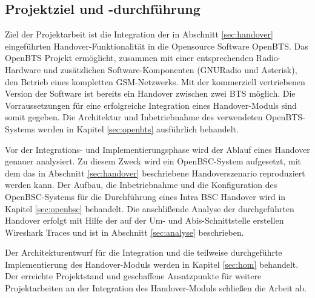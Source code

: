 \subsection{Projektziel und -durchführung}

Ziel der Projektarbeit ist die Integration der in Abschnitt \ref{sec:handover} eingeführten Handover-Funktionalität in die Opensource Software OpenBTS. Das OpenBTS Projekt ermöglicht, zusammen mit einer entsprechenden Radio-Hardware und zusätzlichen Software-Komponenten (GNURadio und Asterisk), den Betrieb eines kompletten GSM-Netzwerks. Mit der kommerziell vertriebenen Version der Software ist bereits ein Handover zwischen zwei BTS möglich. Die Vorraussetzungen für eine erfolgreiche Integration eines Handover-Moduls sind somit gegeben. Die Architektur und Inbetriebnahme des verwendeten OpenBTS-Systems werden in Kapitel \ref{sec:openbts} ausführlich behandelt.

Vor der Integrations- und Implementierungsphase wird der Ablauf eines Handover genauer analysiert. Zu diesem Zweck wird ein OpenBSC-System aufgesetzt, mit dem das in Abschnitt \ref{sec:handover} beschriebene Handoverszenario reproduziert werden kann. Der Aufbau, die Inbetriebnahme und die Konfiguration des OpenBSC-Systems für die Durchführung eines Intra BSC Handover wird in Kapitel \ref{sec:openbsc} behandelt. Die anschlißende Analyse der durchgeführten Handover erfolgt mit Hilfe der auf der Um- und Abis-Schnittstelle erstellen Wireshark Traces und ist in Abschnitt \ref{sec:analyse} beschrieben.

Der Architekturentwurf für die Integration und die teilweise durchgeführte Implementierung des Handover-Moduls werden in Kapitel \ref{sec:hom} behandelt. Der erreichte Projektstand und geschaffene Ansatzpunkte für weitere Projektarbeiten an der Integration des Handover-Moduls schließen die Arbeit ab.


